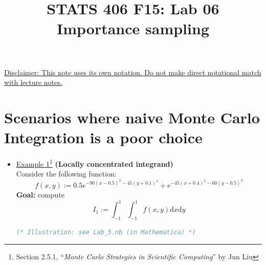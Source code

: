 \documentclass[12pt]{article}
\begin{document}
\title{\Large \bf STATS 406 F15: Lab 06\\
	Importance sampling}
\date{}

\maketitle

\underline{Disclaimer: This note uses its own notation. Do not make direct notational match with lecture notes.}

\section{Scenarios where naive Monte Carlo Integration is a poor choice}

\begin{itemize}
	\item \underline{Example 1}\footnote{Section 2.5.1, ``\emph{Monte Carlo Strategies in Scientific Computing}'' by Jun Liu}
	{\bf (Locally concentrated integrand)}\\
	Consider the following function:
	$$
	f(x, y) :=  0.5 e^ {-90 (x-0.5)^2-45 (y+0.1)^4}  +  e^{-45 (x+0.4)^2-60 (y-0.5)^2}
	$$
	{\bf Goal:} compute
	$$
	I_1 := \int_{-1}^1\int_{-1}^1 f(x, y) \textrm{d}x\textrm{d}y
	$$
\begin{lstlisting}[style=displaycode2, language=Mathematica]
(* Illustration: see Lab_5.nb (in Mathematica) *)
\end{lstlisting}


\end{itemize}
\end{document}
